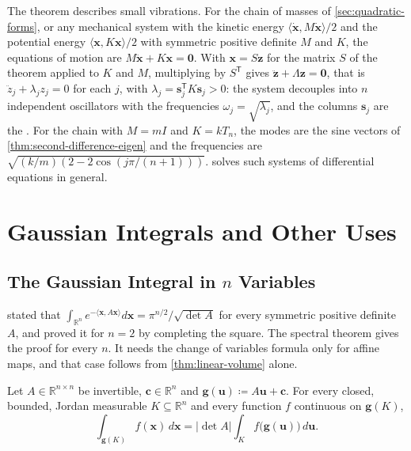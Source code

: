 The theorem describes small vibrations. For the chain of masses of \cref{sec:quadratic-forms}, or any mechanical system with the kinetic energy $\langle\dot{\mathbf x},M\dot{\mathbf x}\rangle/2$ and the potential energy $\langle\mathbf x,K\mathbf x\rangle/2$ with symmetric positive definite $M$ and $K$, the equations of motion are $M\ddot{\mathbf x}+K\mathbf x=\mathbf 0$. With $\mathbf x=S\mathbf z$ for the matrix $S$ of the theorem applied to $K$ and $M$, multiplying by $S^{\mathsf T}$ gives $\ddot{\mathbf z}+\Lambda\mathbf z=\mathbf 0$, that is $\ddot z_j+\lambda_jz_j=0$ for each $j$, with $\lambda_j=\mathbf s_j^{\mathsf T}K\mathbf s_j>0$: the system decouples into $n$ independent oscillators with the frequencies $\omega_j=\sqrt{\lambda_j}$, and the columns $\mathbf s_j$ are the . For the chain with $M=mI$ and $K=kT_n$, the modes are the sine vectors of \cref{thm:second-difference-eigen} and the frequencies are $\sqrt{(k/m)(2-2\cos(j\pi/(n+1)))}$.  solves such systems of differential equations in general.

\section{Gaussian Integrals and Other Uses}
\label{sec:gaussian-uses}

\subsection{The Gaussian Integral in \texorpdfstring{$n$}{n} Variables}

 stated that $\int_{\mathbb R^n}e^{-\langle\mathbf x,A\mathbf x\rangle}d\mathbf x=\pi^{n/2}/\sqrt{\det A}$ for every symmetric positive definite $A$, and proved it for $n=2$ by completing the square. The spectral theorem gives the proof for every $n$. It needs the change of variables formula only for affine maps, and that case follows from \cref{thm:linear-volume} alone.

\begin{lemma}
\label{lem:affine-substitution}
Let $A\in\mathbb R^{n\times n}$ be invertible, $\mathbf c\in\mathbb R^n$ and $\mathbf g(\mathbf u)\coloneqq A\mathbf u+\mathbf c$. For every closed, bounded, Jordan measurable $K\subseteq\mathbb R^n$ and every function $f$ continuous on $\mathbf g(K)$,
\[
\int_{\mathbf g(K)}f(\mathbf x)\,d\mathbf x=|\det A|\int_Kf\bigl(\mathbf g(\mathbf u)\bigr)\,d\mathbf u .
\]
\end{lemma}

